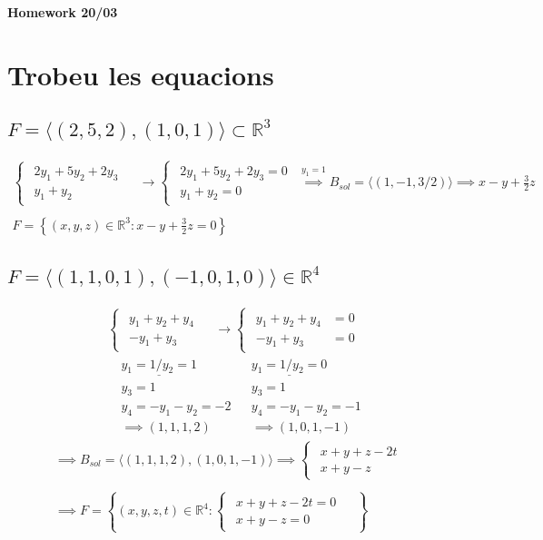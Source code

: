 \documentclass[a4paper, 11pt]{article}
\newcommand{\Bca}{\begin{cases}\begin{aligned}}
\newcommand{\Eca}{\end{aligned}\end{cases}}
\begin{document}
    \begin{center}
        \Large \textbf{Homework 20/03}
    \end{center}
    \normalsize
    
    \section{Trobeu les equacions}
    \subsection{$F = \langle (2,5,2),(1,0,1) \rangle \subset \mathbb{R}^3$}
    \begin{gather*}
        \Bca
            2y_1+5y_2+2y_3&\\
            y_1+y_2&
        \Eca
        \longrightarrow
        \Bca
            2y_1+5y_2+2y_3 = 0\\
            y_1+y_2 = 0
        \Eca
        \stackrel{y_1 = 1}{\implies} B_{sol} = \langle (1,-1,3/2) \rangle
        \implies x-y+\frac{3}{2}z\\\\
        F = \left\{ (x,y,z)\in \mathbb{R}^3 : x-y+\frac{3}{2}z = 0 \right\}
    \end{gather*}
    \subsection{$ F = \langle (1,1,0,1),(-1,0,1,0) \rangle \in \mathbb{R}^4 $}
    \begin{gather*}
        \Bca
            y_1+y_2+y_4&\\
            -y_1+y_3&
        \Eca
        \longrightarrow
        \Bca
            y_1+y_2+y_4&=0\\
            -y_1+y_3&=0
        \Eca
    \end{gather*}
    \begin{align*}
        &\underline{y_1=1 / y_2 = 1} & &\underline{y_1 = 1 / y_2 = 0}\\
        &y_3 = 1 & &y_3 = 1\\
        &y_4 = -y_1-y_2 = -2 & &y_4 = -y_1-y_2 = -1\\
        &\implies (1,1,1,2) & &\implies (1,0,1,-1)
    \end{align*}
    \begin{gather*}
        \implies B_{sol} = \langle (1,1,1,2),(1,0,1,-1) \rangle \implies
        \Bca
            x+y+z-2t&\\
            x+y-z&
        \Eca\\\\
        \implies F = \left\{ (x,y,z,t) \in \mathbb{R}^4 : 
            \Bca
                x+y+z-2t = 0&\\
                x+y-z = 0&
            \Eca
        \right\}
    \end{gather*}
\end{document}
